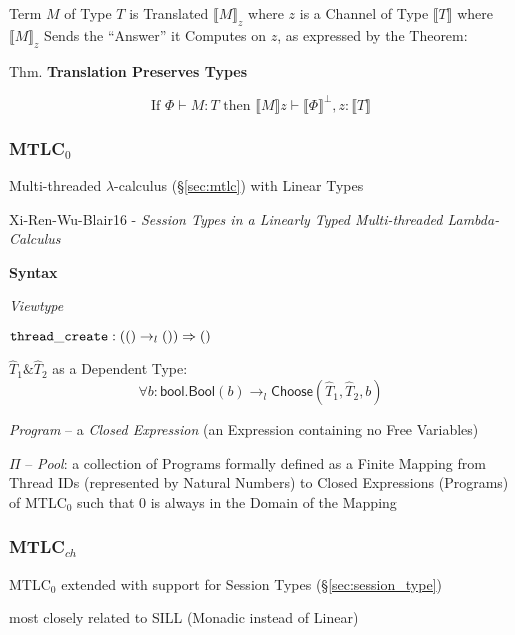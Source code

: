 Term $M$ of Type $T$ is Translated $\llbracket M \rrbracket_z$ where
$z$ is a Channel of Type $\llbracket T \rrbracket$ where $\llbracket M
\rrbracket_z$ Sends the ``Answer'' it Computes on $z$, as expressed by
the Theorem:

Thm. \textbf{Translation Preserves Types}

\[
  \text{If } \Phi \vdash M : T \text{ then }
  \llbracket M \rrbracket z \vdash \llbracket \Phi \rrbracket^\bot,
  z : \llbracket T \rrbracket
\]



\subsubsection{MTLC$_0$}\label{sec:mtlc_0}

\begingroup

\renewcommand{\Unit}{\mathsf{()}}
\newcommand{\bool}{\mathsf{bool}}
\newcommand{\Bool}{\mathsf{Bool}}
\newcommand{\Choose}{\mathsf{Choose}}

Multi-threaded $\lambda$-calculus (\S\ref{sec:mtlc}) with Linear Types

Xi-Ren-Wu-Blair16 - \emph{Session Types in a Linearly Typed
  Multi-threaded Lambda-Calculus}


\textbf{Syntax}

\emph{Viewtype} %

$\mono{thread\_create} : (\Unit \rightarrow_l \Unit) \Rightarrow
\Unit$

$\hat{T}_1 \& \hat{T}_2$ as a Dependent Type:
\[
  \forall b : \bool. \Bool(b)
    \rightarrow_l \Choose(\hat{T}_1, \hat{T}_2, b)
\]

\emph{Program} -- a \emph{Closed Expression} (an Expression containing
no Free Variables)

$\Pi$ -- \emph{Pool}: a collection of Programs formally defined as a
Finite Mapping from Thread IDs (represented by Natural Numbers) to
Closed Expressions (Programs) of MTLC$_0$ such that $0$ is always in
the Domain of the Mapping



\subsubsection{MTLC$_{ch}$}\label{sec:mtlc_ch}

MTLC$_0$ extended with support for Session Types
(\S\ref{sec:session_type})

most closely related to SILL (Monadic instead of Linear) %



